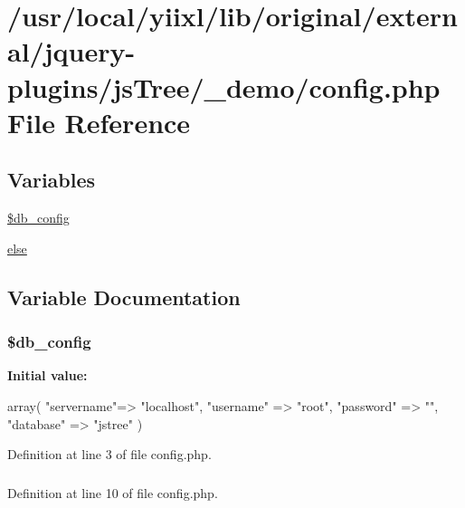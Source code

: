 \hypertarget{config_8php}{
\section{/usr/local/yiixl/lib/original/external/jquery-\/plugins/jsTree/\_\-demo/config.php File Reference}
\label{config_8php}
}
\subsection*{Variables}
\begin{DoxyCompactItemize}
\item 
\hyperlink{config_8php_a16c97b5e3ba6eb6fb0d9e012fac1f3f1}{\$db\_\-config}
\item 
\hyperlink{config_8php_a0544c3fe466e421738dae463968b70ba}{else}
\end{DoxyCompactItemize}


\subsection{Variable Documentation}
\hypertarget{config_8php_a16c97b5e3ba6eb6fb0d9e012fac1f3f1}{
\subsubsection[{\$db\_\-config}]{\setlength{\rightskip}{0pt plus 5cm}\$db\_\-config}}
\label{config_8php_a16c97b5e3ba6eb6fb0d9e012fac1f3f1}
{\bfseries Initial value:}
\begin{DoxyCode}
 array(
    "servername"=> "localhost",
    "username"  => "root",
    "password"  => "",
    "database"  => "jstree"
)
\end{DoxyCode}


Definition at line 3 of file config.php.

\hypertarget{config_8php_a0544c3fe466e421738dae463968b70ba}{
\subsubsection[{else}]{}}
\label{config_8php_a0544c3fe466e421738dae463968b70ba}


Definition at line 10 of file config.php.

